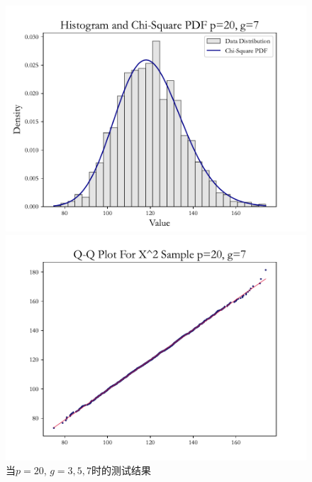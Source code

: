 \documentclass{article} %
\begin{document}
\begin{figure}[H]
\begin{minipage}[b]{0.49\textwidth}
        \includegraphics[width=\textwidth]{img/b/hist_plot_p=20_g=7.pdf}
    \end{minipage}
    \hfill
    \begin{minipage}[b]{0.49\textwidth}
        \centering
        \includegraphics[width=\textwidth]{img/b/qq_plot_p=20_g=7.pdf}
    \end{minipage}
    \caption{当\(p=20\), \(g=3,5,7\)时的测试结果}
    \label{fig:collection3}
\end{figure}
\end{document}
